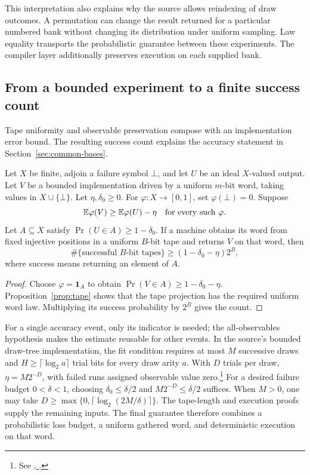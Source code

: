 This interpretation also explains why the source allows reindexing of
draw outcomes. A permutation can change the result returned for a
particular numbered bank without changing its distribution under uniform
sampling. Law equality transports the probabilistic guarantee between these experiments. The compiler layer additionally preserves execution on each supplied bank.

\subsection{From a bounded experiment to a finite success count}
\label{sec:success-budget}

Tape uniformity and observable preservation compose with an implementation error bound. The resulting success count explains the accuracy statement in Section~\ref{sec:common-bases}.

\begin{samepage}
\begin{proposition}\label{prop:success-budget}
Let $X$ be finite, adjoin a failure symbol $\bot$, and let $U$ be an
ideal $X$-valued output. Let $V$ be a bounded implementation driven by a
uniform $m$-bit word, taking values in $X\cup\{\bot\}$.
Let $\eta,\delta_0\geq0$. For $\varphi:X\to[0,1]$, set
$\varphi(\bot)=0$. Suppose
\[
  \mathbb E\varphi(V)\geq\mathbb E\varphi(U)-\eta
  \quad\text{for every such }\varphi.
\]
Let $A\subseteq X$ satisfy $\Pr(U\in A)\geq1-\delta_0$.
If a machine obtains its word from fixed injective positions in a
uniform $B$-bit tape and returns $V$ on that word, then
\[
  \#\{\text{successful }B\text{-bit tapes}\}
  \geq(1-\delta_0-\eta)2^B,
\]
where success means returning an element of $A$.
\end{proposition}
\begin{proof}
Choose $\varphi=\mathbf1_A$ to obtain
$\Pr(V\in A)\geq1-\delta_0-\eta$. Proposition~\ref{prop:tape}
shows that the tape projection has the required uniform word law.
Multiplying its success probability by $2^B$ gives the count.
\end{proof}
\end{samepage}

For a single accuracy event, only its indicator is needed; the
all-observables hypothesis makes the estimate reusable for other events.
In the source's bounded draw-tree implementation, the fit condition
requires at most $M$ successive draws and $H\geq\lceil\log_2 a\rceil$
trial bits for every draw arity $a$. With $D$ trials per draw,
$\eta=M2^{-D}$, with failed runs assigned
observable value zero.\footnote{See
\href{https://github.com/openai/math/blob/fd4aeeb2ee4fc729c18d98444fed42fd0529eeeb/lean/OAI/Combinatorics/MatroidCounting/CommonBases.lean\#L9346-L9349}{, }.}
For a desired failure budget $0<\delta<1$, choosing
$\delta_0\leq\delta/2$ and $M2^{-D}\leq\delta/2$ suffices.
When $M>0$, one may take
$D\geq\max\{0,\lceil\log_2(2M/\delta)\rceil\}$.
The tape-length and execution proofs supply the remaining inputs. The final guarantee therefore combines a probabilistic loss budget, a uniform gathered word, and deterministic execution on that word.

